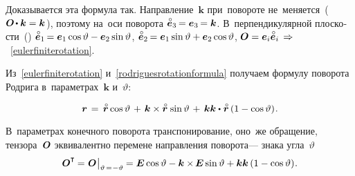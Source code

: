 \begin{otherlanguage}{russian}
\vspace{-0.1em}
Доказывается эта формула так.
Направление~${\bm{k}}$ при~повороте не~меняется~(${\rotationtensor \hspace{-0.2ex}\dotp \bm{k} = \bm{k}\hspace{.12ex}}$), поэтому на~оси поворота ${\mathcircabove{\bm{e}}_3 \hspace{-0.2ex} = \bm{e}_3 \hspace{-0.2ex} = \bm{k}}$.
В~перпендикулярной плоскости~() ${\mathcircabove{\bm{e}}_1 \hspace{-0.2ex} = \bm{e}_1 \operatorname{cos} \vartheta - \bm{e}_2 \operatorname{sin} \vartheta}$, ${\mathcircabove{\bm{e}}_2 \hspace{-0.2ex} = \bm{e}_1 \operatorname{sin} \vartheta + \bm{e}_2 \operatorname{cos} \vartheta}$, ${\rotationtensor = \bm{e}_i \mathcircabove{\bm{e}}_i \,\Rightarrow\hspace{.2ex}}$~\eqref{eulerfiniterotation}.



Из~\eqref{eulerfiniterotation} и~\eqref{rodriguesrotationformula} получаем формулу поворота Родрига в~параметрах~$\bm{k}$ и~$\vartheta$:

\nopagebreak\vspace{-0.3em}\begin{equation*}
\locationvector \hspace{.3ex}
= \hspace{.4ex} \initiallocationvector \operatorname{cos} \vartheta \hspace{.3ex} + \hspace{.3ex} \bm{k} \times \initiallocationvector \hspace{.2ex} \operatorname{sin} \vartheta \hspace{.3ex} + \hspace{.4ex} \bm{k} \bm{k} \dotp \hspace{.1ex} \initiallocationvector \left({1 - \operatorname{cos} \vartheta}\right)
\hspace{-0.25ex} .
\end{equation*}

\vspace{-0.2em}
В~параметрах конечного поворота транспонирование, оно~же обращение, тензора~$\bm{O}$ эквивалентно перемене направления поворота\:--- знака угла~$\vartheta$
\[
\rotationtensor^{\T} \hspace{-0.1ex}=\hspace{.1ex} \rotationtensor \hspace{.1ex} \bigr|_{\vartheta \,=\hspace{.1ex} -\vartheta} \hspace{-0.1ex} = \UnitDyad \operatorname{cos} \vartheta - \bm{k} \times\hspace{-0.2ex} \UnitDyad \operatorname{sin} \vartheta + \bm{k} \bm{k} \left({1 - \operatorname{cos} \vartheta}\right)
\hspace{-0.3ex} .
\]


\end{otherlanguage}
